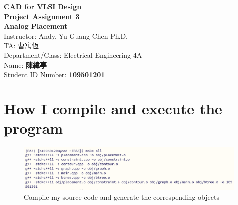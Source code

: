 \documentclass{article}
\begin{document}
\thispagestyle{empty}

\begin{center}
        \vspace*{3cm} %
        {\Huge\bf
            \underline{CAD for VLSI Design }\\}%
        \vspace{3cm}
        {\bf\huge Project Assignment 3\\}
        \vspace{0.5cm}
        {\bf\fontsize{23pt}{20}\selectfont Analog Placement\\}
        \vspace{4cm}
        {\fontsize{23pt}{26pt} \selectfont Instructor: Andy, Yu-Guang Chen  Ph.D.\\}
        {\fontsize{20pt}{26pt} \selectfont TA: 曹寓恆\\}
        \vspace{2cm}
        \fontsize{22pt}{25pt}\selectfont
        Department/Class: Electrical Engineering 4A\\
        \vspace*{1em}
        Name: {\bf 陳緯亭}\\
        \vspace*{1em}
        Student ID Number: {\bf 109501201}\\
\vspace{2cm}
\end{center}
\newpage


\tableofcontents
\listoflistings


\thispagestyle{empty}
\newpage


 \setcounter{page}{1}




\section{How I compile and execute the program}

\begin{figure}[H]
  \centering
  \includegraphics[width=\linewidth]{./img/2024-05-26-19-11-41.png}
  \caption{Compile my source code and generate the corresponding objects}
  \label{g++}
\end{figure}
\end{document}
